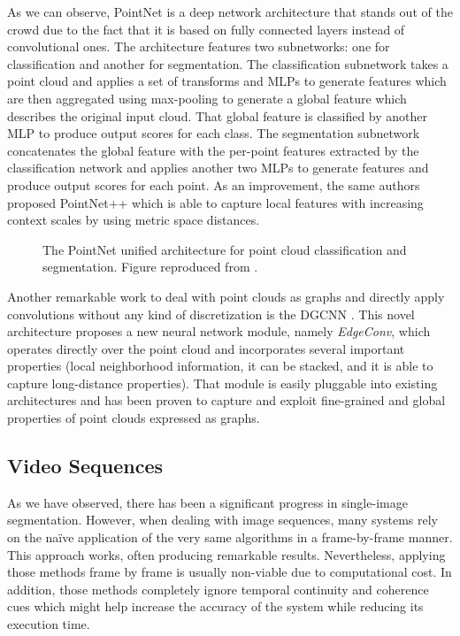 As we can observe, PointNet is a deep network architecture that stands out of the crowd due to the fact that it is based on fully connected layers instead of convolutional ones. The architecture features two subnetworks: one for classification and another for segmentation. The classification subnetwork takes a point cloud and applies a set of transforms and \acp{MLP} to generate features which are then aggregated using max-pooling to generate a global feature which describes the original input cloud. That global feature is classified by another \ac{MLP} to produce output scores for each class. The segmentation subnetwork concatenates the global feature with the per-point features extracted by the classification network and applies another two \acp{MLP} to generate features and produce output scores for each point. As an improvement, the same authors proposed PointNet++ \cite{Qi2017} which is able to capture local features with increasing context scales by using metric space distances.

\begin{figure*}[!t]
	\centering
	\caption{The PointNet unified architecture for point cloud classification and segmentation. Figure reproduced from \cite{Qi2016}.}
	\label{fig:pointnetarchitecture}
\end{figure*}

Another remarkable work to deal with point clouds as graphs and directly apply convolutions without any kind of discretization is the \ac{DGCNN} \cite{Wang2018}. This novel architecture proposes a new neural network module, namely \emph{EdgeConv}, which operates directly over the point cloud and incorporates several important properties (local neighborhood information, it can be stacked, and it is able to capture long-distance properties). That module is easily pluggable into existing architectures and has been proven to capture and exploit fine-grained and global properties of point clouds expressed as graphs.

\subsection{Video Sequences}

As we have observed, there has been a significant progress in single-image segmentation. However, when dealing with image sequences, many systems rely on the naïve application of the very same algorithms in a frame-by-frame manner. This approach works, often producing remarkable results. Nevertheless, applying those methods frame by frame is usually non-viable due to computational cost. In addition, those methods completely ignore temporal continuity and coherence cues which might help increase the accuracy of the system while reducing its execution time.

